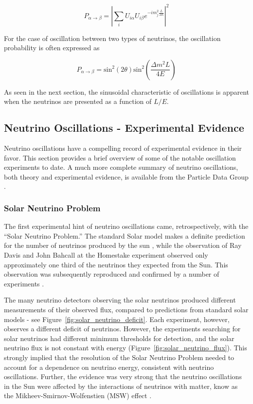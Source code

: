 \begin{equation*}
P_{\alpha\rightarrow\beta} = \left|\sum_i U_{i\alpha} U_{i\beta} e^{-i m_j^2 \frac{L}{2E}}\right|^2
\end{equation*}

For the case of oscillation between two types of neutrinos, the oscillation probability is often expressed as

\begin{equation}
P_{\alpha\rightarrow\beta} = \text{sin}^2(2\theta)\text{sin}^2\left( \frac{\Delta m^2 L}{4 E} \right)
\end{equation}

As seen in the next section, the sinusoidal characteristic of oscillations is apparent when the neutrinos are presented as a function of $L/E$.

\subsection{Neutrino Oscillations - Experimental Evidence}

Neutrino oscillations have a compelling record of experimental evidence in their favor.  This section provides a brief overview of some of the notable oscillation experiments to date.  A much more complete summary of neutrino oscillations, both theory and experimental evidence, is available from the Particle Data Group \cite{Agashe:2014kda}.

\subsubsection{Solar Neutrino Problem}

The first experimental hint of neutrino oscillations came, retrospectively, with the ``Solar Neutrino Problem.''  The standard Solar model makes a definite prediction for the number of neutrinos produced by the sun \cite{Bahcall:2004pz}, while the observation of Ray Davis and John Bahcall at the Homestake experiment observed only approximately one third of the neutrinos they expected from the Sun.  This observation was subsequently reproduced and confirmed by a number of experiments \cite{Hampel:1998xg, Fukuda:1996sz, Gavrin:2005ks, Anselmann:1992um, Altmann:2005ix, Fukuda:2002pe, Ahmad:2001an, Ahmad:2002jz}.

The many neutrino detectors observing the solar neutrinos produced different measurements of their observed flux, compared to predictions from standard solar models - see Figure~\ref{fig:solar_neutrino_deficit}.  Each experiment, however, observes a different deficit of neutrinos.  However, the experiments searching for solar neutrinos had different minimum thresholds for detection, and the solar neutrino flux is not constant with energy (Figure~\ref{fig:solar_neutrino_flux}).  This strongly implied that the resolution of the Solar Neutrino Problem needed to account for a dependence on neutrino energy, consistent with neutrino oscillations.  Further, the evidence was very strong that the neutrino oscillations in the Sun were affected by the interactions of neutrinos with matter, know as the Mikheev-Smirnov-Wolfenstien (MSW) effect \cite{Wolfenstein:1977ue,Mikheev:1986gs}.

